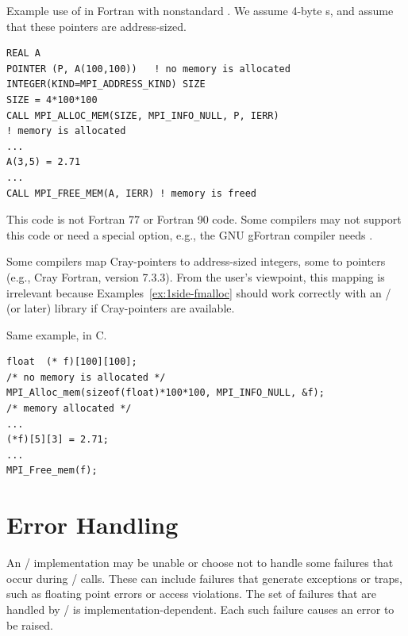 \begin{example}
\label{ex:1side-fmalloc}
%
Example use of  in Fortran with
nonstandard .
We assume 4-byte s, and assume that these pointers
are address-sized.
\begin{lstlisting}[language={[MPI]Fortran}]
REAL A
POINTER (P, A(100,100))   ! no memory is allocated
INTEGER(KIND=MPI_ADDRESS_KIND) SIZE
SIZE = 4*100*100
CALL MPI_ALLOC_MEM(SIZE, MPI_INFO_NULL, P, IERR)
! memory is allocated
...
A(3,5) = 2.71
...
CALL MPI_FREE_MEM(A, IERR) ! memory is freed
\end{lstlisting}

This code is not Fortran 77 or Fortran 90 code.
Some compilers 
may 
not support this code or need a special option, e.g., the GNU gFortran compiler needs .

\begin{implementors}
Some compilers map Cray-pointers to address-sized integers,
some to  pointers (e.g., Cray Fortran, version 7.3.3).
From the user's viewpoint, this mapping is irrelevant 
because Examples~\ref{ex:1side-fmalloc} should work correctly with
an \MPIIIIDOTO/ (or later) library if Cray-pointers are available. 
\end{implementors}
\end{example}

\begin{example}
%
Same example, in C.
\begin{lstlisting}[language={[MPI]C}]
float  (* f)[100][100];
/* no memory is allocated */
MPI_Alloc_mem(sizeof(float)*100*100, MPI_INFO_NULL, &f);
/* memory allocated */
...
(*f)[5][3] = 2.71;
...
MPI_Free_mem(f);
\end{lstlisting}
\end{example}

\section{Error Handling}
\label{sec:errorhandler}

An \MPI/ implementation may be unable or choose not to handle some failures
that occur during \MPI/ calls.  These can include failures that generate
exceptions or traps, such as floating point errors or access
violations.
The set of failures that are handled by \MPI/ is implementation-dependent.
Each such failure causes an error to be raised.

